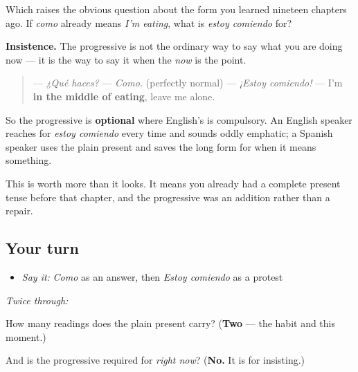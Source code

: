 \begin{culture}
Which raises the obvious question about the form you learned nineteen chapters ago. If \emph{como} already means \emph{I'm eating}, what is \emph{estoy comiendo} for?

\textbf{Insistence.} The progressive is not the ordinary way to say what you are doing now — it is the way to say it when the \emph{now} is the point.

\begin{quote}
— \emph{¿Qué haces?} — \emph{Como.} (perfectly normal) — \emph{¡Estoy comiendo!} — I'm \textbf{in the middle of eating}, leave me alone.
\end{quote}

So the progressive is \textbf{optional} where English's is compulsory. An English speaker reaches for \emph{estoy comiendo} every time and sounds oddly emphatic; a Spanish speaker uses the plain present and saves the long form for when it means something.

This is worth more than it looks. It means you already had a complete present tense before that chapter, and the progressive was an addition rather than a repair.
\end{culture}

\subsection*{Your turn}
\begin{itemize}
\raggedright
  \item \emph{Say it:} \emph{Como} as an answer, then \emph{Estoy comiendo} as a protest
\end{itemize}

\emph{Twice through:}

\begin{tcolorbox}[breakable,colback=teal!4,colframe=teal!35!black,title={Before you move on}]
How many readings does the plain present carry? (\textbf{Two} — the habit and this moment.)

And is the progressive required for \emph{right now}? (\textbf{No.} It is for insisting.)
\end{tcolorbox}
